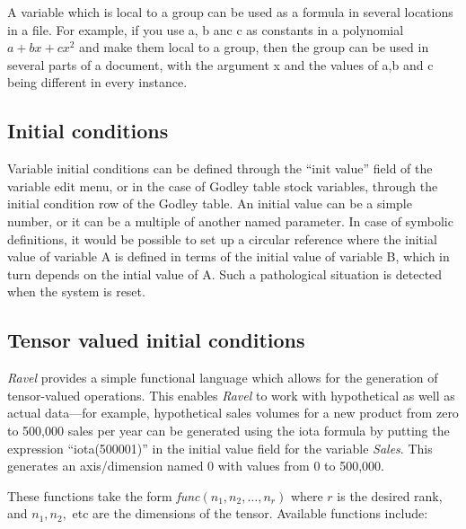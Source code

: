 A variable which is local to a group can be used as a formula in
several locations in a file. For example, if you use a, b anc c as
constants in a polynomial $a+bx+cx^{2}$ and make them local to a
group, then the group can be used in several parts of a document, with
the argument x and the values of a,b and c being different in every
instance.

\subsection{Initial conditions}

\label{var:init}

Variable initial conditions can be defined through the ``init value''
field of the variable edit menu, or in the case of Godley table stock
variables, through the initial condition row of the Godley table.
An initial value can be a simple number, or it can be a multiple of
another named parameter. In case of symbolic definitions, it would
be possible to set up a circular reference where the initial value
of variable A is defined in terms of the initial value of variable
B, which in turn depends on the intial value of A. Such a pathological
situation is detected when the system is reset.

\subsection{Tensor valued initial conditions}

\label{tensor-init}

\emph{Ravel} provides a simple functional language which allows for
the generation of tensor-valued operations. This enables \emph{Ravel}
to work with hypothetical as well as actual data---for example, hypothetical
sales volumes for a new product from zero to 500,000 sales per year
can be generated using the iota formula by putting the expression
``iota(500001)'' in the initial value field for the variable \emph{Sales}.
This generates an axis/dimension named 0 with values from 0 to 500,000. 

These functions take the form {\em func}$(n_{1},n_{2},\ldots,n_{r})$
where $r$ is the desired rank, and $n_{1},n_{2},$ etc are the dimensions
of the tensor. Available functions include:

